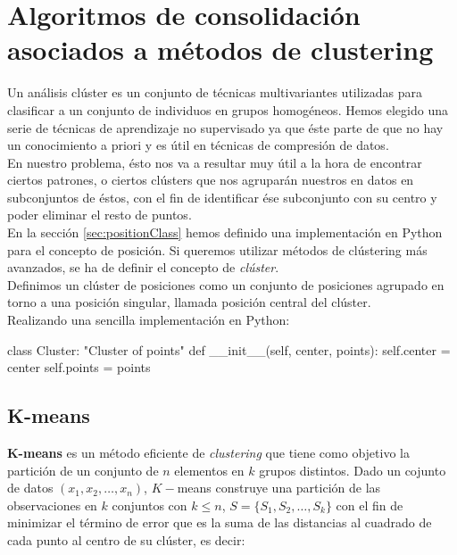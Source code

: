 \documentclass[a4paper, 12pt]{article}
\begin{document}
\pagebreak
\section{Algoritmos de consolidaci\'on asociados a m\'etodos de clustering}

Un an\'alisis cl\'uster es un conjunto de t\'ecnicas multivariantes utilizadas para clasificar a un conjunto de individuos en grupos homog\'eneos. Hemos elegido una serie de t\'ecnicas de aprendizaje no supervisado ya que \'este parte de que no hay un conocimiento a priori y es \'util en t\'ecnicas de compresi\'on de datos.\\

En nuestro problema, \'esto nos va a resultar muy \'util a la hora de encontrar ciertos patrones, o ciertos cl\'usters que nos agrupar\'an nuestros en datos en subconjuntos de \'estos, con el fin de identificar \'ese subconjunto con su centro y poder eliminar el resto de puntos. \\

En la secci\'on \ref{sec:positionClass} hemos definido una implementaci\'on en Python para el concepto de posici\'on. Si queremos utilizar m\'etodos de cl\'ustering m\'as avanzados, se ha de definir el concepto de \textit{cl\'uster}. \\

Definimos un cl\'uster de posiciones como un conjunto de posiciones agrupado en torno a una posici\'on singular, llamada posici\'on central del cl\'uster.\\

Realizando una sencilla implementaci\'on en Python:\\

\begin{python}
class Cluster:
	"Cluster of points"
	def __init__(self, center, points):
		self.center = center
		self.points = points
\end{python}

\pagebreak
\subsection{K-means}

\textbf{K-means}\cite{importantPlaces} es un m\'etodo eficiente de \textit{clustering} que tiene como objetivo la partici\'on de un conjunto de $n$ elementos en $k$ grupos distintos. Dado un cojunto de datos $(x_1, x_2, \ldots , x_n)$, $K-$means construye una partici\'on de las observaciones en $k$ conjuntos con $k\leq n$, $S=\{S_1, S_2, \ldots, S_k\}$ con el fin de minimizar el t\'ermino de error que es la suma de las distancias al cuadrado de cada punto al centro de su cl\'uster, es decir:\\
\end{document}
